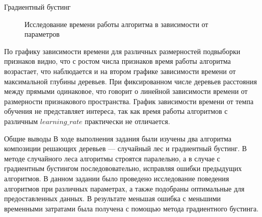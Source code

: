 \documentclass[12pt]{article}
\begin{document}
\begin{section}{Градиентный бустинг}
\begin{figure}[h!]
\begin{minipage}[h]{0.5\linewidth}
\end{minipage}
\caption{Исследование времени  работы алгоритма в зависимости от параметров}
\label{ris:image1}
\end{figure}

По графику зависимости времени для различных размерностей подвыборки признаков видно, что с ростом числа признаков время работы алгоритма возрастает, что наблюдается и на втором графике зависимости времени от максимальной глубины деревьев. При фиксированном числе деревьев расстояния между прямыми одинаковое, что говорит о линейной зависимости времени от размерности признакового пространства. График зависимости времени от темпа обучения не представляет интереса, так как время работы алгоритмов с различным $learning\_rate$ практически не отличается.
\end{section}

\begin{section}{Общие выводы}
В ходе выполнения задания были изучены два алгоритма композиции решающих деревьев  — случайный лес и градиентный бустинг. В методе случайного леса алгоритмы строятся паралельно, а в случае с градиентным бустингом последововательно, исправляя ошибки предыдущих алгоритмов. В данном задании было проведено исследование поведения алгоритмов при различных параметрах, а также подобраны оптимальные для предоставленных данных. В результате меньшая ошибка с меньшими временными затратами была получена с помощью метода градиентного бустинга.
\end{section}
\end{document}
